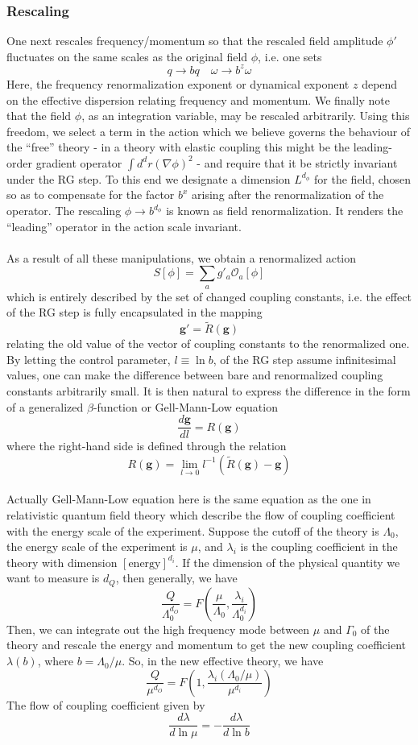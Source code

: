 \subsubsection{Rescaling}
One next rescales frequency/momentum so that the rescaled field amplitude $\phi'$ fluctuates on the same scales as the original field $\phi$, i.e. one sets
\[q \to bq \quad \omega \to b^z \omega\]
Here, the frequency renormalization exponent or dynamical exponent $z$ depend on the effective dispersion relating
frequency and momentum. 
We finally note that the field $\phi$, as an integration variable, may be rescaled arbitrarily. Using this freedom, we select a term in the action which we believe governs the behaviour of the ``free'' theory - in a theory with elastic coupling this might be the leading-order gradient operator $\int d^d r (\nabla \phi)^2$ - and require that it be strictly invariant under the RG step. 
To this end we designate a dimension $L^{d_{\phi}}$ for the field, chosen so as to compensate for the factor $b^x$ arising after the renormalization of the operator. The rescaling $\phi \to b^{d_{\phi}}$ is known as field renormalization. It renders the ``leading'' operator in the action scale invariant.
\\ \\
As a result of all these manipulations, we obtain a renormalized action
\[S[\phi] = \sum_a g'_a \mathcal{O}_a[\phi]\]
which is entirely described by the set of changed coupling constants, i.e. the effect of the RG step is fully encapsulated in the mapping
\[\bm{g}' = \tilde{R}(\bm{g})\]
relating the old value of the vector of coupling constants to the renormalized one. 
By letting the control parameter, $l \equiv \ln b$, of the RG step assume infinitesimal values, one can make the difference between bare and renormalized coupling constants
arbitrarily small. 
It is then natural to express the difference in the form of a generalized $\beta$-function or Gell-Mann-Low equation
\[\frac{d\bm{g}}{dl} = R(\bm{g})\]
where the right-hand side is defined through the relation
\[R(\bm{g}) = \lim_{l \to 0} l^{-1} (\tilde{R}(\bm{g}) - \bm{g})\]
\\
Actually Gell-Mann-Low equation here is the same equation as the one in relativistic quantum field theory which describe the flow of coupling coefficient with the energy scale of the experiment. Suppose the cutoff of the theory is $\Lambda_0$, the energy scale of the experiment is $\mu$, and $\lambda_i$ is the coupling coefficient in the theory with dimension $[\mbox{energy}] ^{d_{i}}$. If the dimension of the physical quantity we want to measure is $d_Q$, then generally, we have
\[\frac{Q}{\Lambda_0^{d_O}} = F(\frac{\mu}{\Lambda_0},\frac{\lambda_i}{\Lambda_0^{d_i}})\]
Then, we can integrate out the high frequency mode between $\mu$ and $\Gamma_0$ of the theory and rescale the energy and momentum to get the new coupling coefficient $\lambda(b)$, where $b = \Lambda_0 / \mu$. So, in the new effective theory, we have
\[\frac{Q}{\mu^{d_O}} = F(1,\frac{\lambda_i(\Lambda_0 / \mu)}{\mu^{d_i}})\]
The flow of coupling coefficient given by
\[\frac{d\lambda}{d\ln \mu} = - \frac{d\lambda}{d\ln b}\]

